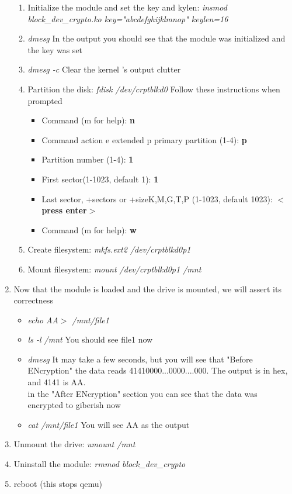 \documentclass[draftclsnofoot, onecolumn, 10pt, compsoc]{IEEEtran}
\begin{document}
\begin{enumerate}
\begin{enumerate}
					\item Initialize the module and set the key and kylen: \textit{insmod block\_dev\_crypto.ko key="abcdefghijklmnop" keylen=16}
					\item \textit{dmesg} In the output you should see that the module was initialized and the key was set
					\item \textit{dmesg -c} Clear the kernel 's output clutter
					\item Partition the disk:\textit{ fdisk /dev/crptblkd0}
						Follow these instructions when prompted
						\begin{itemize}
							\item Command (m for help): \textbf{n}
							\item Command action
   e extended
   p primary partition (1-4):
\textbf{p}
							\item Partition number (1-4): \textbf{1}
							\item First sector(1-1023, default 1): \textbf{1}
							\item Last sector, +sectors or +size{K,M,G,T,P} (1-1023, default 1023): \textbf{$<$press enter$>$}
							\item Command (m for help): \textbf{w}
						\end{itemize}
					\item Create filesystem: \textit{mkfs.ext2 /dev/crptblkd0p1}
					\item Mount filesystem: \textit{mount /dev/crptblkd0p1 /mnt}
				\end{enumerate}
				\item Now that the module is loaded and the drive is mounted, we will assert its correctness
				\begin{itemize}
					\item \textit{echo AA$>$ /mnt/file1}
					\item \textit{ls -l /mnt} You should see file1 now
					\item \textit{dmesg} It may take a few seconds, but you will see that "Before ENcryption" the data reads 41410000...0000....000. The output is in hex, and 4141 is AA. \\
					in the "After ENcryption" section you can see that the data was encrypted to giberish now
					\item \textit{cat /mnt/file1} You will see AA as the output
				\end{itemize}
				\item Unmount the drive: \textit{umount /mnt}
				\item Uninstall the module: \textit{rmmod block\_dev\_crypto}
				\item reboot (this stops qemu)
			\end{enumerate}
\end{document}
